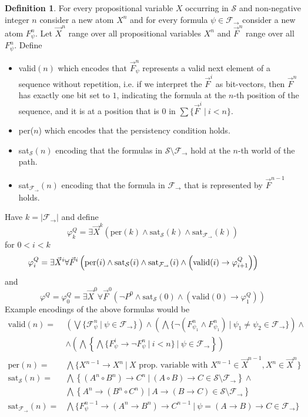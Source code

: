 \documentclass[a4paper,12pt]{report}
\theoremstyle{definition}
\theoremstyle{definition}
\theoremstyle{definition}
\theoremstyle{definition}
\theoremstyle{definition}
\newtheorem{definition}[theorem]{Definition}
\theoremstyle{definition}
\theoremstyle{definition}
\begin{document}
	\begin{definition}
		For every propositional variable $X$ occurring in $\mathcal S$ and non-negative integer $n$ consider a new atom $X^n$ and for every formula $\psi\in\mathcal F_\to$ consider a new atom $F_\psi^n$. Let $\vec X^n$ range over all propositional variables $X^n$ and $\vec F^n$ range over all $F_\psi^n$. Define
		\begin{itemize}
			\item valid$(n)$ which encodes that $\vec F^n_\psi$ represents a valid next element of a sequence without repetition, i.e. if we interpret the $\vec F^i$ as bit-vectors, then $\vec F^n$ has exactly one bit set to $1$, indicating the formula at the $n$-th position of the sequence, and it is at a position that is $0$ in $\sum\{\vec F^i\:|\:i < n\}$.
			\item per($n$) which encodes that the persistency condition holds.
			\item sat$_{\mathcal S}(n)$ encoding that the formulas in $\mathcal S\setminus\mathcal F_\to$ hold at the $n$-th world of the path.
			\item sat$_{\mathcal F_\to}(n)$ encoding that the formula in $\mathcal F_\to$ that is represented by $\vec F^{n-1}$ holds.
		\end{itemize}
		Have $k = |\mathcal F_\to|$ and define
		$$\varphi^Q_{k} = \exists \vec X^k\left(\text{per}(k)\wedge \text{sat}_{\mathcal S}(k)\wedge \text{sat}_{\mathcal F_\to}(k)\right)$$
		for $0 < i < k$
		$$\hspace*{-.8cm}\varphi^Q_{i} = \exists \vec X^i\forall \vec F^i\left(\text{per}(i)\wedge \text{sat}_{\mathcal S}(i)\wedge \text{sat}_{\mathcal F_\to}(i)\wedge\left(\text{valid}(i)\to \varphi^Q_{i+1}\right)\right)$$
		and $$\varphi^Q = \varphi_0^Q = \exists \vec X^0\forall \vec F^0\left(\neg P^0\wedge \text{sat}_{\mathcal S}(0)\wedge(\text{valid}(0)\to \varphi_1^Q)\right)$$
		Example encodings of the above formulas would be
		\begin{align*}
			\text{valid}(n) = &\left(\bigvee \{\mathcal F^n_\psi\:|\:\psi\in\mathcal F_\to\}\right)\wedge\left(\bigwedge \{\neg(F^n_{\psi_1}\wedge F^n_{\psi_1})\:|\:\psi_1\neq\psi_2\in\mathcal F_\to\}\right)\wedge\\&\wedge\left(\bigwedge\left\{\bigwedge\{F^i_\psi\to\neg F^n_\psi\:|\:i < n\}\:|\:\psi\in\mathcal F_\to\right\}\right)\\
			\text{per}(n) = & \bigwedge\{X^{n-1}\to X^n\:|\: X \text{ prop. variable with }X^{n-1}\in\vec X^{n-1}, X^n \in\vec X^{n}\}\\
			\text{sat}_{\mathcal S}(n) = &\bigwedge\left\{(A^n\circ B^n)\to C^n\:|\:(A\circ B)\to C\in \mathcal S\setminus\mathcal F_\to\right\}\wedge\\
			&\bigwedge\left\{A^n\to (B^n\circ C^n)\:|\:A\to (B\to C)\in \mathcal S\setminus\mathcal F_\to\right\}\\
			\text{sat}_{\mathcal F_\to}(n) = & \bigwedge\{F^{n-1}_\psi\to (A^n\to B^n)\to C^{n-1}\:|\:\psi = (A\to B)\to C\in\mathcal F_\to\}
		\end{align*}
	\end{definition}
	
\end{document}
